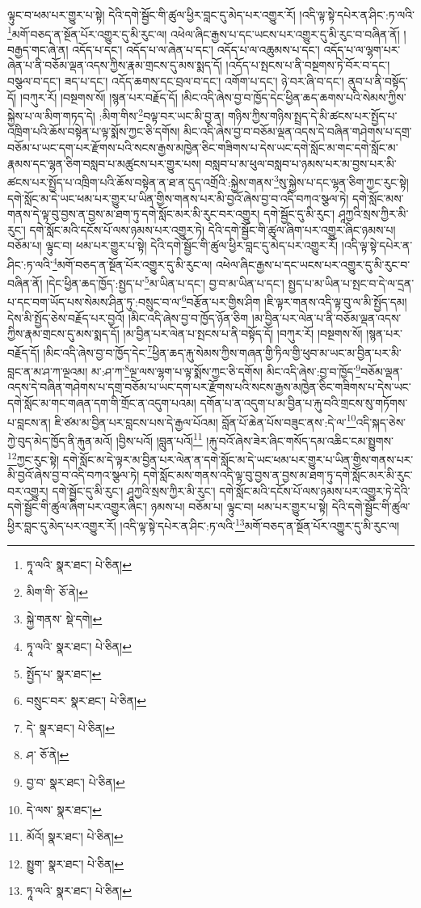 ལྟུང་བ་ཕམ་པར་གྱུར་པ་སྟེ། དེའི་དགེ་སྦྱོང་གི་ཚུལ་ཕྱིར་བླང་དུ་མེད་པར་འགྱུར་རོ། །འདི་ལྟ་སྟེ་དཔེར་ན་ཤིང་:ཏ་ལའི་\footnote{ཏཱ་ལའི་  སྣར་ཐང་།  པེ་ཅིན། }མགོ་བཅད་ན་སྔོན་པོར་འགྱུར་དུ་མི་རུང་ལ། འཕེལ་ཞིང་རྒྱས་པ་དང་ཡངས་པར་འགྱུར་དུ་མི་རུང་བ་བཞིན་ནོ། །བརྒྱད་གང་ཞེ་ན། འདོད་པ་དང་། འདོད་པ་ལ་ཞེན་པ་དང་། འདོད་པ་ལ་འཆུམས་པ་དང་། འདོད་པ་ལ་ལྷག་པར་ཞེན་པ་ནི་བཅོམ་ལྡན་འདས་ཀྱིས་རྣམ་གྲངས་དུ་མས་སྨད་དོ། །འདོད་པ་སྤངས་པ་ནི་བསྔགས་ཏེ་བོར་བ་དང་། བསྩལ་བ་དང་། ཟད་པ་དང་། འདོད་ཆགས་དང་བྲལ་བ་དང་། འགོག་པ་དང་། ཉེ་བར་ཞི་བ་དང་། ནུབ་པ་ནི་བསྟོད་དོ། །བཀུར་རོ། །བསྔགས་སོ། །སྙན་པར་བརྗོད་དོ། །མིང་འདི་ཞེས་བྱ་བ་ཁྱོད་དེང་ཕྱིན་ཆད་ཆགས་པའི་སེམས་ཀྱིས་སྐྱེས་པ་ལ་མིག་གཏད་དེ། :མིག་གིས་\footnote{མིག་གི་  ཅོ་ནེ། }བལྟ་བར་ཡང་མི་བྱ་ན། གཉིས་ཀྱིས་གཉིས་སྤྲད་དེ་མི་ཚངས་པར་སྤྱོད་པ་འཁྲིག་པའི་ཆོས་བསྟེན་པ་ལྟ་སྨོས་ཀྱང་ཅི་དགོས། མིང་འདི་ཞེས་བྱ་བ་བཅོམ་ལྡན་འདས་དེ་བཞིན་གཤེགས་པ་དགྲ་བཅོམ་པ་ཡང་དག་པར་རྫོགས་པའི་སངས་རྒྱས་མཁྱེན་ཅིང་གཟིགས་པ་དེས་ཡང་དགེ་སློང་མ་གང་དགེ་སློང་མ་རྣམས་དང་ལྷན་ཅིག་བསླབ་པ་མཚུངས་པར་གྱུར་པས། བསླབ་པ་མ་ཕུལ་བསླབ་པ་ཉམས་པར་མ་བྱས་པར་མི་ཚངས་པར་སྤྱོད་པ་འཁྲིག་པའི་ཆོས་བསྟེན་ན་ཐ་ན་དུད་འགྲོའི་:སྐྱེས་གནས་\footnote{སྐྱེ་གནས་  སྡེ་དགེ། }སུ་སྐྱེས་པ་དང་ལྷན་ཅིག་ཀྱང་རུང་སྟེ། དགེ་སློང་མ་དེ་ཡང་ཕམ་པར་གྱུར་པ་ཡིན་གྱིས་གནས་པར་མི་བྱའོ་ཞེས་བྱ་བ་འདི་བཀའ་སྩལ་ཏེ། དགེ་སློང་མས་གནས་དེ་ལྟ་བུ་བྱས་ན་བྱས་མ་ཐག་ཏུ་དགེ་སློང་མར་མི་རུང་བར་འགྱུར། དགེ་སྦྱོང་དུ་མི་རུང་། ཤཱཀྱའི་སྲས་ཀྱིར་མི་རུང་། དགེ་སློང་མའི་དངོས་པོ་ལས་ཉམས་པར་འགྱུར་ཏེ། དེའི་དགེ་སྦྱོང་གི་ཚུལ་ཞིག་པར་འགྱུར་ཞིང་ཉམས་པ། བཅོམ་པ། ལྟུང་བ། ཕམ་པར་གྱུར་པ་སྟེ། དེའི་དགེ་སྦྱོང་གི་ཚུལ་ཕྱིར་བླང་དུ་མེད་པར་འགྱུར་རོ། །འདི་ལྟ་སྟེ་དཔེར་ན་ཤིང་:ཏ་ལའི་\footnote{ཏཱ་ལའི་  སྣར་ཐང་།  པེ་ཅིན། }མགོ་བཅད་ན་སྔོན་པོར་འགྱུར་དུ་མི་རུང་ལ། འཕེལ་ཞིང་རྒྱས་པ་དང་ཡངས་པར་འགྱུར་དུ་མི་རུང་བ་བཞིན་ནོ། །དེང་ཕྱིན་ཆད་ཁྱོད་:སྤྱད་པ་\footnote{སྤྱོད་པ་  སྣར་ཐང་། }མ་ཡིན་པ་དང་། བྱ་བ་མ་ཡིན་པ་དང་། སྤྱད་པ་མ་ཡིན་པ་སྤང་བ་དེ་ལ་དྲན་པ་དང་བག་ཡོད་པས་སེམས་ཤིན་ཏུ་:བསྲུང་བ་ལ་\footnote{བསྲུང་བར་  སྣར་ཐང་།  པེ་ཅིན། }བརྩོན་པར་གྱིས་ཤིག །ཇི་ལྟར་གནས་འདི་ལྟ་བུ་ལ་མི་སྤྱོད་དམ། དེས་མི་སྤྱོད་ཅེས་བརྗོད་པར་བྱའོ། །མིང་འདི་ཞེས་བྱ་བ་ཁྱོད་ཉོན་ཅིག །མ་བྱིན་པར་ལེན་པ་ནི་བཅོམ་ལྡན་འདས་ཀྱིས་རྣམ་གྲངས་དུ་མས་སྨད་དོ། །མ་བྱིན་པར་ལེན་པ་སྤངས་པ་ནི་བསྟོད་དོ། །བཀུར་རོ། །བསྔགས་སོ། །སྙན་པར་བརྗོད་དོ། །མིང་འདི་ཞེས་བྱ་བ་ཁྱོད་དེང་\footnote{དེ་  སྣར་ཐང་།  པེ་ཅིན། }ཕྱིན་ཆད་རྐུ་སེམས་ཀྱིས་གཞན་གྱི་ཏིལ་གྱི་ཕུབ་མ་ཡང་མ་བྱིན་པར་མི་བླང་ན་མ་ཤ་ཀ་ལྔའམ། མ་:ཤ་ཀ་\footnote{ཤ་  ཅོ་ནེ། }ལྔ་ལས་ལྷག་པ་ལྟ་སྨོས་ཀྱང་ཅི་དགོས། མིང་འདི་ཞེས་:བྱ་བ་ཁྱོད་\footnote{བྱ་བ་  སྣར་ཐང་།  པེ་ཅིན། }བཅོམ་ལྡན་འདས་དེ་བཞིན་གཤེགས་པ་དགྲ་བཅོམ་པ་ཡང་དག་པར་རྫོགས་པའི་སངས་རྒྱས་མཁྱེན་ཅིང་གཟིགས་པ་དེས་ཡང་དགེ་སློང་མ་གང་གཞན་དག་གི་གྲོང་ན་འདུག་པའམ། དགོན་པ་ན་འདུག་པ་མ་བྱིན་པ་རྐུ་བའི་གྲངས་སུ་གཏོགས་པ་བླངས་ན། ཇི་ཙམ་མ་བྱིན་པར་བླངས་པས་དེ་རྒྱལ་པོའམ། བློན་པོ་ཆེན་པོས་བཟུང་ནས་:དེ་ལ་\footnote{དེ་ལས་  སྣར་ཐང་། }འདི་སྐད་ཅེས་ཀྱེ་བུད་མེད་ཁྱོད་ནི་རྐུན་མའོ། །བྱིས་པའོ། །བླུན་པའོ།\footnote{མོའོ།  སྣར་ཐང་།  པེ་ཅིན། } །རྐུ་བའོ་ཞེས་ཟེར་ཞིང་གསོད་དམ་འཆིང་ངམ་སྤྱུགས་\footnote{སྤྱུག་  སྣར་ཐང་།  པེ་ཅིན། }ཀྱང་རུང་སྟེ། དགེ་སློང་མ་དེ་ལྟར་མ་བྱིན་པར་ལེན་ན་དགེ་སློང་མ་དེ་ཡང་ཕམ་པར་གྱུར་པ་ཡིན་གྱིས་གནས་པར་མི་བྱའོ་ཞེས་བྱ་བ་འདི་བཀའ་སྩལ་ཏེ། དགེ་སློང་མས་གནས་འདི་ལྟ་བུ་བྱས་ན་བྱས་མ་ཐག་ཏུ་དགེ་སློང་མར་མི་རུང་བར་འགྱུར། དགེ་སྦྱོང་དུ་མི་རུང་། ཤཱཀྱའི་སྲས་ཀྱིར་མི་རུང་། དགེ་སློང་མའི་དངོས་པོ་ལས་ཉམས་པར་འགྱུར་ཏེ་དེའི་དགེ་སྦྱོང་གི་ཚུལ་ཞིག་པར་འགྱུར་ཞིང་། ཉམས་པ། བཅོམ་པ། ལྟུང་བ། ཕམ་པར་གྱུར་པ་སྟེ། དེའི་དགེ་སྦྱོང་གི་ཚུལ་ཕྱིར་བླང་དུ་མེད་པར་འགྱུར་རོ། །འདི་ལྟ་སྟེ་དཔེར་ན་ཤིང་:ཏ་ལའི་\footnote{ཏཱ་ལའི་  སྣར་ཐང་།  པེ་ཅིན། }མགོ་བཅད་ན་སྔོན་པོར་འགྱུར་དུ་མི་རུང་ལ། 